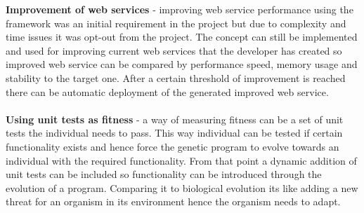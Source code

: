 \textbf{Improvement of web services} - improving web service performance using the framework was an initial requirement
in the project but due to complexity and time issues it was opt-out from the project. The concept can still be implemented
and used for improving current web services that the developer has created so improved web service can be compared by performance
speed, memory usage and stability to the target one. After a certain threshold of improvement is reached there can be automatic deployment
of the generated improved web service.
\paragraph{}
\textbf{Using unit tests as fitness} - a way of measuring fitness can be a set of unit tests the individual needs to pass. This way
individual can be tested if certain functionality exists and hence force the genetic program to evolve towards an individual with
the required functionality. From that point a dynamic addition of unit tests can be included so functionality can be introduced through
the evolution of a program. Comparing it to biological evolution its like adding a new threat for an organism in its environment hence
the organism needs to adapt.


